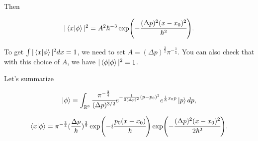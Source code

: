 \documentclass[main.tex]{subfiles}
\begin{document}
Then

\begin{equation}
|\bra{x}\ket{\phi}|^2 = A^2 \hbar^{-3} \exp(- \cfrac{(\Delta p)^2(x - x_0)^2}{\hbar^2}).
\end{equation}

To get $\int |\bra{x}\ket{\phi}|^2 dx = 1$, we need to set $A = (\Delta p)^{\frac{3}{2}} \pi^{-\frac{3}{4}}$. You can also check that with this choice of $A$, we have $|\bra{\phi}\ket{\phi}|^2 = 1$.

Let's summarize

\begin{equation}
\ket{\phi} = \int_{\mathbb{R}^3} \cfrac{\pi^{-\frac{3}{4}}}{(\Delta p)^{3/2}} e^{-\frac{1}{2(\Delta p)^2}(p - p_0)^2} e^{\frac{i}{\hbar}x_0 p}\ket{p} dp,
\end{equation}

\begin{equation}
\bra{x}\ket{\phi} =  \pi^{-\frac{3}{4}} (\frac{\Delta p}{\hbar})^{\frac{3}{2}} 
\exp(-i\cfrac{p_0(x - x_0)}{\hbar})\exp( - \cfrac{(\Delta p)^2(x - x_0)^2}{2\hbar^2}).
\end{equation}

%
%
%
%
%
%
\end{document}
